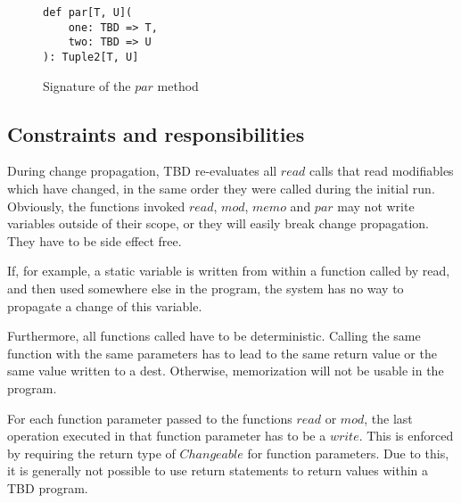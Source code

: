 \begin{figure}
\begin{lstlisting}[frame=single,basicstyle=\ttfamily]
def par[T, U](
    one: TBD => T, 
    two: TBD => U
): Tuple2[T, U] 
\end{lstlisting}
\caption{Signature of the $par$ method}
\label{code:par}
\end{figure}

\subsection{Constraints and responsibilities}

During change propagation, TBD re-evaluates all $read$ calls that read modifiables which have changed, in the same order they were called during the initial run. Obviously, the functions invoked $read$, $mod$, $memo$ and $par$ may not write variables outside of their scope, or they will easily break change propagation. They have to be side effect free. 

If, for example, a static variable is written from within a function called by read, and then used somewhere else in the program, the system has no way to propagate a change of this variable.

Furthermore, all functions called have to be deterministic. Calling the same function with the same parameters has to lead to the same return value or the same value written to a dest. Otherwise, memorization will not be usable in the program.

For each function parameter passed to the functions $read$ or $mod$, the last operation executed in that function parameter has to be a $write$. This is enforced by requiring the return type of $Changeable$ for function parameters.
Due to this, it is generally not possible to use return statements to return values within a TBD program.  